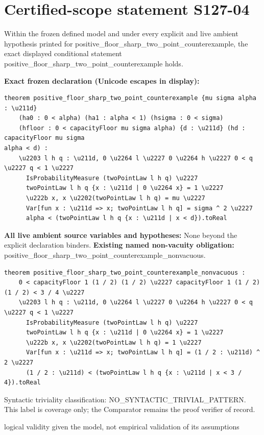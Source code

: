 \documentclass[11pt]{article}
\begin{document}
\section*{Certified-scope statement S127-04}
Within the frozen defined model and under every explicit and live ambient hypothesis printed for positive\_\allowbreak{}floor\_\allowbreak{}sharp\_\allowbreak{}two\_\allowbreak{}point\_\allowbreak{}counterexample, the exact displayed conditional statement positive\_\allowbreak{}floor\_\allowbreak{}sharp\_\allowbreak{}two\_\allowbreak{}point\_\allowbreak{}counterexample holds.
\par\noindent\textbf{Exact frozen declaration (Unicode escapes in display):}
\begin{Verbatim}[breaklines=true,breakanywhere=true,fontsize=\scriptsize]
theorem positive_floor_sharp_two_point_counterexample {mu sigma alpha : \u211d}
    (ha0 : 0 < alpha) (ha1 : alpha < 1) (hsigma : 0 < sigma)
    (hfloor : 0 < capacityFloor mu sigma alpha) {d : \u211d} (hd : capacityFloor mu sigma
alpha < d) :
    \u2203 l h q : \u211d, 0 \u2264 l \u2227 0 \u2264 h \u2227 0 < q \u2227 q < 1 \u2227
      IsProbabilityMeasure (twoPointLaw l h q) \u2227
      twoPointLaw l h q {x : \u211d | 0 \u2264 x} = 1 \u2227
      \u222b x, x \u2202(twoPointLaw l h q) = mu \u2227
      Var[fun x : \u211d => x; twoPointLaw l h q] = sigma ^ 2 \u2227
      alpha < (twoPointLaw l h q {x : \u211d | x < d}).toReal
\end{Verbatim}
\noindent\textbf{All live ambient source variables and hypotheses:}
None beyond the explicit declaration binders.
\noindent\textbf{Existing named non-vacuity obligation:} positive\_\allowbreak{}floor\_\allowbreak{}sharp\_\allowbreak{}two\_\allowbreak{}point\_\allowbreak{}counterexample\_\allowbreak{}nonvacuous.
\begin{Verbatim}[breaklines=true,breakanywhere=true,fontsize=\scriptsize]
theorem positive_floor_sharp_two_point_counterexample_nonvacuous :
    0 < capacityFloor 1 (1 / 2) (1 / 2) \u2227 capacityFloor 1 (1 / 2) (1 / 2) < 3 / 4 \u2227
    \u2203 l h q : \u211d, 0 \u2264 l \u2227 0 \u2264 h \u2227 0 < q \u2227 q < 1 \u2227
      IsProbabilityMeasure (twoPointLaw l h q) \u2227
      twoPointLaw l h q {x : \u211d | 0 \u2264 x} = 1 \u2227
      \u222b x, x \u2202(twoPointLaw l h q) = 1 \u2227
      Var[fun x : \u211d => x; twoPointLaw l h q] = (1 / 2 : \u211d) ^ 2 \u2227
      (1 / 2 : \u211d) < (twoPointLaw l h q {x : \u211d | x < 3 / 4}).toReal
\end{Verbatim}
\noindent Syntactic triviality classification: NO\_\allowbreak{}SYNTACTIC\_\allowbreak{}TRIVIAL\_\allowbreak{}PATTERN. This label is coverage only; the Comparator remains the proof verifier of record.
\par\noindent logical validity given the model, not empirical validation of its assumptions
\end{document}
